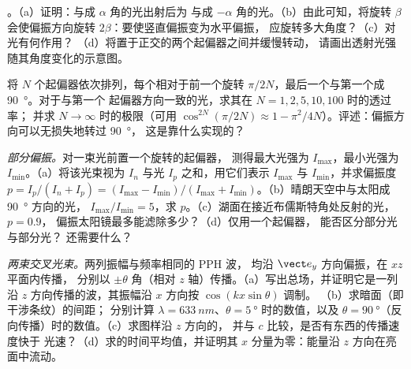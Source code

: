 \begin{exercise}[$\star\star$]\label{exo:b2:plane-waves-polarization:7}
。（a）证明：与成 $\alpha$ 角的光出射后为
与成 $-\alpha$ 角的光。（b）由此可知，将旋转 $\beta$
会使偏振方向旋转 $2\beta$：要使竖直偏振变为水平偏振，
应旋转多大角度？（c）对光有何作用？
（d）将置于正交的两个起偏器之间并缓慢转动，
请画出透射光强随其角度变化的示意图。
\end{exercise}

\begin{exercise}[$\star\star$]\label{exo:b2:plane-waves-polarization:8}
将 $N$ 个起偏器依次排列，每个相对于前一个旋转
$\pi/2N$，最后一个与第一个成 \qty{90}{\degree}。对于与第一个
起偏器方向一致的光，求其在 $N = 1, 2, 5, 10, 100$ 时的透过率；
并求 $N \to \infty$ 时的极限（可用 $\cos^{2N}(\pi/2N) \approx
1 - \pi^2/4N$）。评述：偏振方向可以无损失地转过 \qty{90}{\degree}，
这是靠什么实现的？
\end{exercise}

\begin{exercise}[$\star\star$]\label{exo:b2:plane-waves-polarization:9}
\emph{部分偏振。}对一束光前置一个旋转的起偏器，
测得最大光强为 $I_{\max}$，最小光强为 $I_{\min}$。（a）将该光束视为 $I_n$
与光 $I_p$ 之和，用它们表示 $I_{\max}$ 与
$I_{\min}$，并求偏振度 $p = I_p/(I_n + I_p) =
(I_{\max} - I_{\min})/(I_{\max} + I_{\min})$。（b）晴朗天空中与太阳成 \qty{90}{\degree} 方向的光，
$I_{\max}/I_{\min} = 5$，求 $p$。（c）湖面在接近布儒斯特角处反射的光，$p = 0.9$，
偏振太阳镜最多能滤除多少？（d）仅用一个起偏器，
能否区分部分光与部分光？
还需要什么？
\end{exercise}

\begin{exercise}[$\star\star\star$]\label{exo:b2:plane-waves-polarization:10}
\emph{两束交叉光束。}两列振幅与频率相同的 PPH 波，
均沿 $\vect e_y$ 方向偏振，在 $xz$ 平面内传播，
分别以 $\pm\theta$ 角（相对 $z$ 轴）传播。（a）写出总场，并证明它是一列
沿 $z$ 方向传播的波，其振幅沿 $x$ 方向按 $\cos(kx\sin\theta)$ 调制。
（b）求暗面（即干涉条纹）的间距；
分别计算 $\lambda = \qty{633}{nm}$、$\theta = \qty{5}{\degree}$ 时的数值，以及
$\theta = \qty{90}{\degree}$（反向传播）时的数值。（c）求图样沿 $z$ 方向的，
并与 $c$ 比较，是否有东西的传播速度快于
光速？（d）求的时间平均值，并证明其
$x$ 分量为零：能量沿 $z$ 方向在亮
面中流动。
\end{exercise}

